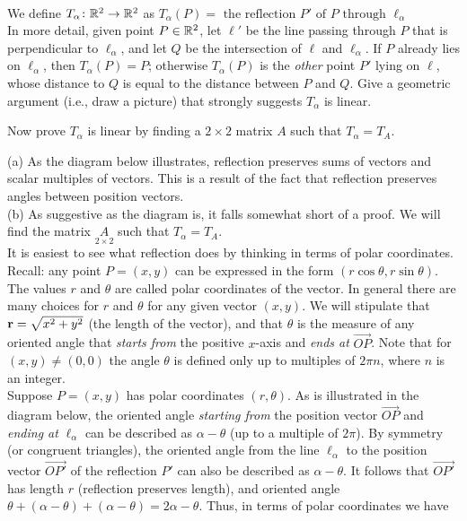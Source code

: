\\
We define $T_{\alpha}\colon{\mathbb R}^2\rightarrow {\mathbb R}^2$ as 
$
T_\alpha(P)=\text{ the reflection $P'$ of $P$ through $\ell_\alpha$}
$
\\
In more detail, given point $P\in{\mathbb R}^2$, let $\ell'$ be the line passing through $P$ that is perpendicular to $\ell_{\alpha}$, and let $Q$ be the intersection of $\ell$ and $\ell_\alpha$. If $P$ already lies on $\ell_{\alpha}$, then $T_\alpha(P)=P$; otherwise $T_\alpha(P)$ is the {\em other} point $P'$ lying on $\ell$, whose distance to $Q$ is equal to the distance between $P$ and $Q$. 
\bb
\ii Give a geometric argument (i.e., draw a picture) that strongly suggests $T_\alpha$ is linear. 

\ii Now prove $T_\alpha$ is linear by finding a $2\times 2$ matrix $A$ such that $T_\alpha=T_A$.
\ee
\begin{solution}
\noindent
(a) As the diagram below illustrates, reflection preserves sums of vectors and scalar multiples of vectors. This is a result of the fact that reflection preserves angles between position vectors. 
\\
(b) As suggestive as the diagram is, it falls somewhat short of a proof. We will find the matrix $\underset{2\times 2}{A}$ such that $T_{\alpha}=T_A$. 
\vspace{.1in}
\\
It is easiest to see what reflection does by thinking in terms of polar coordinates. Recall: any point $P=(x,y)$ can be expressed in the form $(r\cos\theta, r\sin\theta)$.  The values $r$ and $\theta$ are called polar coordinates of the vector. In general there are many choices for $r$ and $\theta$ for any given vector $(x,y)$. We will stipulate that ${\mathbf r}=\sqrt{x^2+y^2}$ (the length of the vector), and that $\theta$ is the measure of any oriented angle that {\em starts from} the positive $x$-axis and {\em ends at} $\overrightarrow{OP}$. Note that for $(x,y)\ne (0,0)$ the angle $\theta$ is defined only up to multiples of $2\pi n$, where $n$ is an integer.  
\\
Suppose $P=(x,y)$ has polar coordinates $(r,\theta)$. As is illustrated in the diagram below, the oriented angle {\em starting from} the position vector $\overrightarrow{OP}$ and {\em ending at} $\ell_\alpha$ can be described as $\alpha-\theta$ (up to a multiple of $2\pi$). By symmetry (or congruent triangles), the oriented angle from the line $\ell_\alpha$ to the position vector $\overrightarrow{OP'}$ of the reflection $P'$ can also be described as $\alpha-\theta$.  It follows that $\overrightarrow{OP'}$ has length $r$ (reflection preserves length), and oriented angle $\theta+(\alpha-\theta)+(\alpha-\theta)=2\alpha-\theta$. Thus, in terms of polar coordinates we have 

\end{solution}
